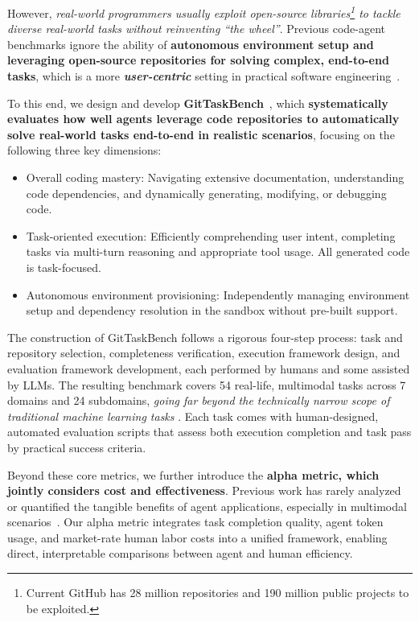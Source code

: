 \documentclass[letterpaper]{article} %
\begin{document}
However, \textit{real-world programmers usually exploit open-source libraries\footnote{Current GitHub has 28 million repositories and 190 million public projects to be exploited.} to tackle diverse real-world tasks without reinventing ``the wheel''}. Previous code-agent benchmarks ignore the ability of \textbf{autonomous environment setup and leveraging open-source repositories for solving complex, end-to-end tasks}, which is a more \textbf{\textit{user-centric}} setting in practical software engineering~\cite{gitagent, tang2023ml-bench, repomaster2025}.

To this end, we design and develop \textbf{GitTaskBench}~\cite{gittaskbench2025}, 
which \textbf{systematically evaluates how well agents leverage code repositories to automatically solve real-world tasks end-to-end in realistic scenarios}, focusing on the following three key dimensions:
\begin{itemize}
    \item Overall coding mastery: Navigating extensive documentation, understanding code dependencies, and dynamically generating, modifying, or debugging code.
    \item Task-oriented execution: Efficiently comprehending user intent, completing tasks via multi-turn reasoning and appropriate tool usage. All generated code is task-focused.
    \item Autonomous environment provisioning: Independently managing environment setup and dependency resolution in the sandbox without pre-built support.
\end{itemize}

The construction of GitTaskBench follows a rigorous four-step process: task and repository selection, completeness verification, execution framework design, and evaluation framework development, each performed by humans and some assisted by LLMs. The resulting benchmark covers 54 real-life, multimodal tasks across 7 domains and 24 subdomains, \textit{going far beyond the technically narrow scope of traditional machine learning tasks} \cite{liu2018mlbench, tang2023ml-bench, chan2025mle-bench}. 
Each task comes with human-designed, automated evaluation scripts that assess both execution completion and task pass by practical success criteria. 

Beyond these core metrics, we further introduce the \textbf{alpha metric, which jointly considers cost and effectiveness}. Previous work has rarely analyzed or quantified the tangible benefits of agent applications, especially in multimodal scenarios~\cite{swe-agent,2025artificialReport,chen2025xbench}. 
%
Our alpha metric integrates task completion quality, agent token usage, and market-rate human labor costs into a unified framework, enabling direct, interpretable comparisons between agent and human efficiency. 
\end{document}
